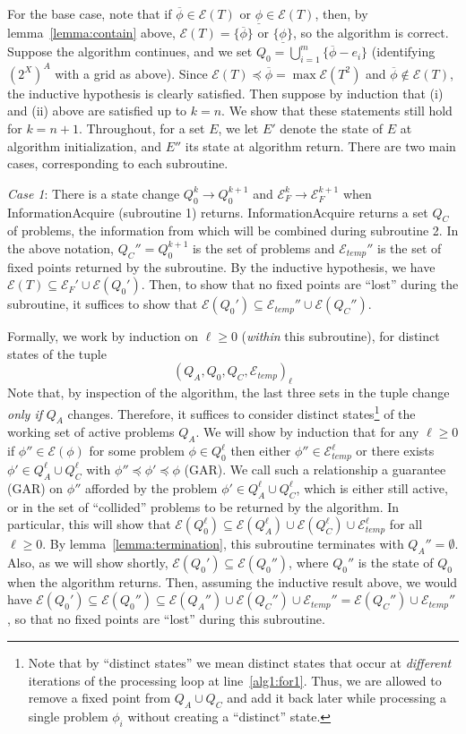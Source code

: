 \documentclass[11pt,reqno]{amsart}
\theoremstyle{definition}
\numberwithin{equation}{section}
\newcommand{\ol}{\overline}
\newcommand{\ul}{\underline}
\newcommand{\pre}{\phi}
\newcommand{\prealloc}{(2^X)^A}
\newcommand{\sub}{\subseteq}
\newcommand{\fix}{\mathcal{E}}
\newcommand{\peq}{\preceq}
\newcommand{\toppre}{\ol{\pre}}
\newcommand{\acto}{Q_0}
\newcommand{\actok}{Q_0^k}
\newcommand{\acta}{Q_A}
\newcommand{\actc}{Q_C}
\newcommand{\fixfind}{\mathcal{E}_F}
\newcommand{\fixfindk}{\mathcal{E}^k_F}
\newcommand{\fixfindkk}{\mathcal{E}^{k + 1}_F}
\newcommand{\fixtemp}{\mathcal{E}_{temp}}
\begin{document}
\begin{enumerate}
For the base case, note that if $\toppre \in \fix(T)$ or $\ul{\pre} \in \fix(T)$, then, by lemma~\ref{lemma:contain} above, $\fix(T) = \{\toppre\}$ or $\{\ul{\pre}\}$, so the algorithm is correct. 
Suppose the algorithm continues, and we set $\acto = \bigcup_{i = 1}^m \{\toppre - e_i\}$ (identifying $\prealloc$ with a grid as above).
Since $\fix(T) \peq \toppre = \max \fix(T^2)$ and $\toppre \not \in \fix(T)$, the inductive hypothesis is clearly satisfied. 
Then suppose by induction that (i) and (ii) above are satisfied up to $k = n$.
We show that these statements still hold for $k = n +1$.
Throughout, for a set $E$, we let $E'$ denote the state of $E$ at algorithm initialization, and $E''$ its state at algorithm return.
There are two main cases, corresponding to each subroutine.

\emph{Case 1}: There is a state change $\actok \to \acto^{k +1}$ and $\fixfindk \to \fixfindkk$ when InformationAcquire (subroutine 1) returns.
InformationAcquire returns a set $\actc$ of problems, the information from which will be combined during subroutine 2.
In the above notation, $\actc'' = \acto^{k+1}$ is the set of problems and $\fixtemp''$ is the set of fixed points returned by the subroutine.
By the inductive hypothesis, we have $\fix(T) \sub \fixfind' \cup \fix(\acto')$.
Then, to show that no fixed points are ``lost'' during the subroutine, it suffices to show that $\fix(\acto') \sub \fixtemp'' \cup \fix(\actc'')$.

Formally, we work by induction on $\ell \geq 0$ (\emph{within} this subroutine), for distinct states of the tuple \[(\acta,\acto,\actc,\fixtemp)_{\ell}\]
Note that, by inspection of the algorithm, the last three sets in the tuple change \emph{only if} $\acta$ changes. 
Therefore, it suffices to consider distinct states\footnote{Note that by ``distinct states'' we mean distinct states that occur at \emph{different} iterations of the processing loop at line~\ref{alg1:for1}.
Thus, we are allowed to remove a fixed point from $\acta \cup \actc$ and add it back later while processing a single problem $\pre_i$ without creating a ``distinct'' state.} of the working set of active problems $\acta$.
We will show by induction that for any $\ell \geq 0$ if $\pre'' \in \fix(\pre)$ for some problem $\pre \in \acto^{\ell}$ then either $\pre'' \in \fixtemp^{\ell}$ or there exists $\pre' \in \acta^{\ell} \cup \actc^{\ell}$ with $\pre'' \peq \pre' \peq \pre$ (GAR).
We call such a relationship a guarantee (GAR) on $\pre''$ afforded by the problem $\pre' \in \acta^{\ell} \cup \actc^{\ell}$, which is either still active, or in the set of ``collided'' problems to be returned by the algorithm.
In particular, this will show that $\fix(\acto^{\ell}) \sub \fix(\acta^{\ell}) \cup \fix(\actc^{\ell}) \cup \fixtemp^{\ell}$ for all $\ell \geq 0$.
By lemma~\ref{lemma:termination}, this subroutine terminates with $\acta'' = \emptyset$. 
Also, as we will show shortly, $\fix(\acto') \sub \fix(\acto'')$, where $\acto''$ is the state of $\acto$ when the algorithm returns. 
Then, assuming the inductive result above, we would have $\fix(\acto') \sub \fix(\acto'') \sub \fix(\acta'') \cup \fix(\actc'') \cup \fixtemp'' = \fix(\actc'') \cup \fixtemp''$, so that no fixed points are ``lost'' during this subroutine.


\end{enumerate}
\end{document}
